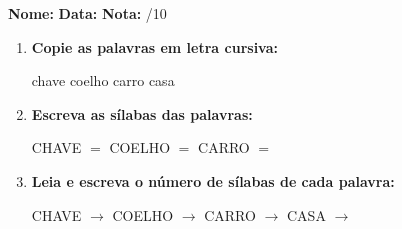 \begin{exercicio}



\noindent\textbf{Nome:} \underline{\hspace{3.2cm}} \quad \textbf{Data:} \underline{\hspace{1.6cm}} \quad \textbf{Nota:} \underline{\hspace{0.9cm}}/10


\begin{enumerate}

  \item \textbf{Copie as palavras em letra cursiva:}
  \begin{center}
  chave \quad coelho \quad carro \quad casa
  \end{center}
  \begin{center}
  \underline{\hspace{2.4cm}} \quad \underline{\hspace{2.4cm}} \quad \underline{\hspace{2.4cm}} \quad \underline{\hspace{2.4cm}}
  \end{center}

  \item \textbf{Escreva as sílabas das palavras:}
  \begin{center}
  CHAVE $=$ \underline{\hspace{1.5cm}} \underline{\hspace{1.5cm}} \quad COELHO $=$ \underline{\hspace{1.5cm}} \underline{\hspace{1.5cm}} \quad CARRO $=$ \underline{\hspace{1.5cm}} \underline{\hspace{1.5cm}}
  \end{center}

  \item \textbf{Leia e escreva o número de sílabas de cada palavra:}
  \begin{center}
  CHAVE $\rightarrow$ \underline{\hspace{0.9cm}} \quad COELHO $\rightarrow$ \underline{\hspace{0.9cm}} \quad CARRO $\rightarrow$ \underline{\hspace{0.9cm}} \quad CASA $\rightarrow$ \underline{\hspace{0.9cm}}
  \end{center}


\end{enumerate}
\end{exercicio}
